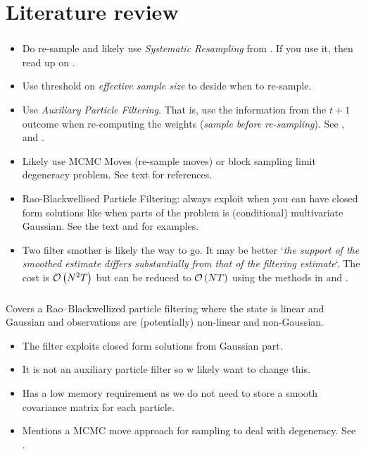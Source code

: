 















\section{Literature review}
\subsubsection*{\cite{doucet09}}
\begin{itemize}
	\item Do re-sample and likely use \emph{Systematic Resampling} from \cite{kitagawa96}. If you use it, then read up on \cite{douc05}.
	\item Use threshold on \emph{effective sample size} to deside when to re-sample.
	\item Use \emph{Auxiliary Particle Filtering}. That is, use the information from the $t + 1$ outcome when re-computing the weights (\textit{sample before re-sampling}). See \cite{carpenter99}, \cite{pitt01} and \cite{pitt99}.
	\item Likely use MCMC Moves (re-sample moves) or block sampling limit degeneracy problem. See text for references.
	\item Rao-Blackwellised Particle Filtering: always exploit when you can have closed form solutions like when parts of the problem is (conditional) multivariate Gaussian. See the text and \cite{andrieu02} for examples. 
	\item Two filter smother is likely the way to go. It may be better `\textit{the support of the smoothed estimate differs substantially from that of the filtering estimate}`. The cost is $\mathcal{O}\left( N^2T\right)$ but can be reduced to $\mathcal{O}\left( NT\right)$ using the methods in \cite{fearnhead10} and \cite{briers05}.
\end{itemize}

\subsubsection*{\cite{andrieu02}}
Covers a Rao–Blackwellized particle filtering where the state is linear and Gaussian and observations are (potentially) non-linear and non-Gaussian. 

\begin{itemize}
	\item The filter exploits closed form solutions from Gaussian part.
	\item It is not an auxiliary particle filter so w likely want to change this.
	\item Has a low memory requirement as we do not need to store a smooth covariance matrix for each particle.
	\item Mentions a MCMC move approach for sampling to deal with degeneracy. See \cite{de97}.
\end{itemize}

